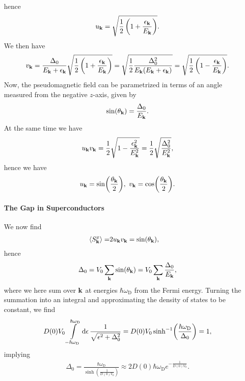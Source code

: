 hence
\begin{align*}
	u_{\vb{k}} = \sqrt{\frac{1}{2}\left(1 + \frac{\epsilon_{\vb{k}}}{E_{\vb{k}}}\right)}.
\end{align*}
We then have
\begin{align*}
	v_{\vb{k}} = \frac{\Delta_{0}}{E_{\vb{k}} + \epsilon_{\vb{k}}}\sqrt{\frac{1}{2}\left(1 + \frac{\epsilon_{\vb{k}}}{E_{\vb{k}}}\right)} = \sqrt{\frac{1}{2}\frac{\Delta_{0}^{2}}{E_{\vb{k}}(E_{\vb{k}} + \epsilon_{\vb{k}})}} = \sqrt{\frac{1}{2}\left(1 - \frac{\epsilon_{\vb{k}}}{E_{\vb{k}}}\right)}.
\end{align*}
Now, the pseudomagnetic field can be parametrized in terms of an angle measured from the negative $z$-axis, given by
\begin{align*}
	\sin(\theta_{\vb{k}}) = \frac{\Delta_{0}}{E_{\vb{k}}}.
\end{align*}
At the same time we have
\begin{align*}
	u_{\vb{k}}v_{\vb{k}} = \frac{1}{2}\sqrt{1 - \frac{\epsilon_{\vb{k}}^{2}}{E_{\vb{k}}^{2}}} = \frac{1}{2}\sqrt{\frac{\Delta_{0}^{2}}{E_{\vb{k}}^{2}}},
\end{align*}
hence we have
\begin{align*}
	u_{\vb{k}} = \sin(\frac{\theta_{\vb{k}}}{2}),\ v_{\vb{k}} = \cos(\frac{\theta_{\vb{k}}}{2}).
\end{align*}

\paragraph{The Gap in Superconductors}
We now find
\begin{align*}
	\expval{S_{\vb{k}}^{x}} =& 2u_{\vb{k}}v_{\vb{k}} = \sin(\theta_{\vb{k}}),
\end{align*}
hence
\begin{align*}
	\Delta_{0} = V_{0}\sum\limits_{\vb{k}}\sin(\theta_{\vb{k}}) = V_{0}\sum\limits_{\vb{k}}\frac{\Delta_{0}}{E_{\vb{k}}},
\end{align*}
where we here sum over $\vb{k}$ at energies $\hbar\omega_{\text{D}}$ from the Fermi energy. Turning the summation into an integral and approximating the density of states to be constant, we find
\begin{align*}
	D(0)V_{0}\int\limits_{-\hbar\omega_{\text{D}}}^{\hbar\omega_{\text{D}}}\dd{\epsilon}\frac{1}{\sqrt{\epsilon^{2} + \Delta_{0}^{2}}} = D(0)V_{0}\sinh[-1](\frac{\hbar\omega_{\text{D}}}{\Delta_{0}}) = 1,
\end{align*}
implying
\begin{align*}
	\Delta_{0} = \frac{\hbar\omega_{\text{D}}}{\sinh(\frac{1}{D(0)V_{0}})} \approx 2D(0)\hbar\omega_{\text{D}}e^{-\frac{1}{D(0)V_{0}}}.
\end{align*}


